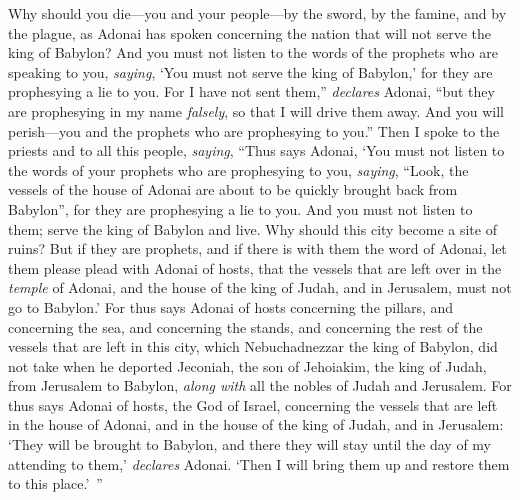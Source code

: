\begin{biblechapter}
\verse Why should you die—you and your people—by the sword, by the famine, and by the plague, as Adonai has spoken concerning the nation that will not serve the king of Babylon?
\verse And you must not listen to the words of the prophets who are speaking to you, \textit{saying}, ‘You must not serve the king of Babylon,’ for they are prophesying a lie to you.
\verse For I have not sent them,” \textit{declares} Adonai, “but they are prophesying in my name \textit{falsely}, so that I will drive them away. And you will perish—you and the prophets who are prophesying to you.”
 Then I spoke to the priests and to all this people, \textit{saying}, “Thus says Adonai, ‘You must not listen to the words of your prophets who are prophesying to you, \textit{saying}, “Look, the vessels of the house of Adonai are about to be quickly brought back from Babylon”, for they are prophesying a lie to you.
\verse And you must not listen to them; serve the king of Babylon and live. Why should this city become a site of ruins?
\verse But if they are prophets, and if there is with them the word of Adonai, let them please plead with Adonai of hosts, that the vessels that are left over in the \textit{temple} of Adonai, and the house of the king of Judah, and in Jerusalem, must not go to Babylon.’
\verse For thus says Adonai of hosts concerning the pillars, and concerning the sea, and concerning the stands, and concerning the rest of the vessels that are left in this city,
\verse which Nebuchadnezzar the king of Babylon, did not take when he deported Jeconiah, the son of Jehoiakim, the king of Judah, from Jerusalem to Babylon, \textit{along with} all the nobles of Judah and Jerusalem.
\verse For thus says Adonai of hosts, the God of Israel, concerning the vessels that are left in the house of Adonai, and in the house of the king of Judah, and in Jerusalem:
\verse ‘They will be brought to Babylon, and there they will stay until the day of my attending to them,’ \textit{declares} Adonai. ‘Then I will bring them up and restore them to this place.’ ”
\end{biblechapter}

